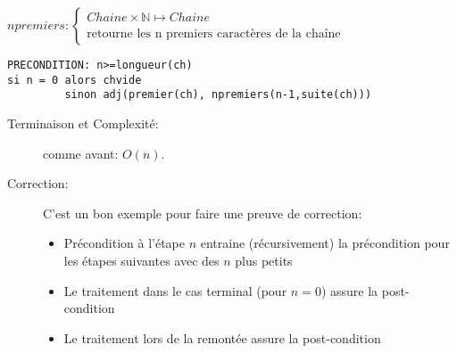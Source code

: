 \documentclass[10pt]{article}\usepackage[correction,nu]{esial}
\begin{document}
\begin{Question}
  $npremiers: \left\{
    \begin{array}{l}
      Chaine\times\mathbb{N}\mapsto Chaine\\
      \text{retourne les n premiers caractères de la chaîne}
    \end{array}\right.$  
\end{Question}
\begin{Reponse}
  \begin{Verbatim}[label=npremiers(ch\quotesinglbase n)]
PRECONDITION: n>=longueur(ch)
si n = 0 alors chvide
         sinon adj(premier(ch), npremiers(n-1,suite(ch)))    
  \end{Verbatim}
  \begin{description}
  \item[Terminaison et Complexité:] comme avant: $O(n)$.
  \item[Correction:] C'est un bon exemple pour faire une preuve de correction:
    \begin{itemize}
    \item Précondition à l'étape $n$ entraine (récursivement) la précondition
      pour les étapes suivantes avec des $n$ plus petits
    \item Le traitement dans le cas terminal (pour $n=0$) assure la
      post-condition
    \item Le traitement lors de la remontée assure la post-condition
    \end{itemize}
  \end{description}
\end{Reponse}
\end{document}
